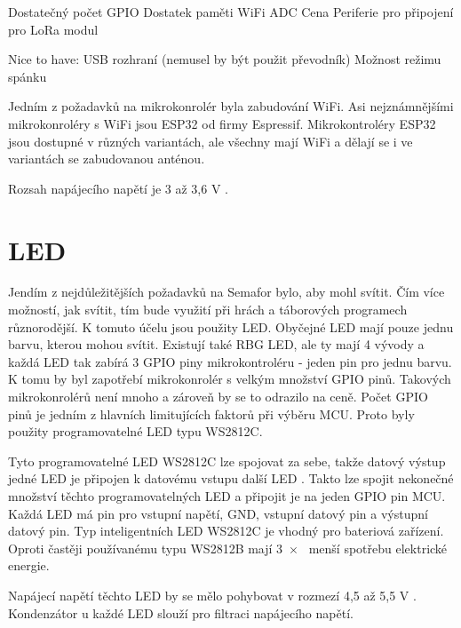 Dostatečný počet GPIO %
Dostatek paměti %
WiFi
ADC %
Cena %
Periferie pro připojení pro LoRa modul

Nice to have:
USB rozhraní (nemusel by být použit převodník)
Možnost režimu spánku %


Jedním z požadavků na mikrokonrolér byla zabudování WiFi. Asi nejznámnějšími mikrokonroléry s WiFi jsou ESP32 od firmy 
Espressif. Mikrokontroléry ESP32 jsou dostupné v různých variantách, ale všechny mají WiFi a dělají se i ve variantách 
se zabudovanou anténou. 

Rozsah napájecího napětí je 3 až 3,6 V \cite{ESP_C3_dtsh}.

\section{LED}
Jendím z nejdůležitějších požadavků na Semafor bylo, aby mohl svítit. Čím více možností, jak svítit, tím bude využití 
při hrách a táborových programech různorodější. K tomuto účelu jsou použity LED. Obyčejné LED mají pouze jednu barvu, kterou 
mohou svítit. Existují také RBG LED, ale ty mají 4 vývody a každá LED tak zabírá 3 GPIO piny mikrokontroléru - jeden pin
pro jednu barvu. K tomu by byl zapotřebí mikrokonrolér s velkým množství GPIO pinů. Takových mikrokonrolérů není mnoho a zároveň 
by se to odrazilo na ceně. Počet GPIO pinů je jedním z hlavních limitujících faktorů při výběru MCU. Proto byly použity programovatelné 
LED typu WS2812C.

Tyto programovatelné LED WS2812C lze spojovat za sebe, takže datový výstup jedné LED je připojen k datovému vstupu další 
LED \cite{WS2812C_dtsh}. Takto lze spojit nekonečné množství těchto programovatelných LED a připojit je na jeden GPIO pin MCU. 
Každá LED má pin pro vstupní napětí, GND, vstupní datový pin a výstupní datový pin. Typ inteligentních LED WS2812C je vhodný pro 
bateriová zařízení. Oproti častěji používanému typu WS2812B mají 3~$\times$~ menší spotřebu elektrické energie. 

Napájecí napětí těchto LED by se mělo pohybovat v rozmezí 4,5 až 5,5 V \cite{WS2812C_dtsh}. Kondenzátor u každé LED slouží pro 
filtraci napájecího napětí. 



